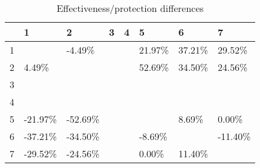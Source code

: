 \begin{table}[ht]
\centering
\begin{tabular}{rlllllll}
  \hline
 & 1 & 2 & 3 & 4 & 5 & 6 & 7 \\ 
  \hline
1 &  & -4.49\% &  &  & 21.97\% & 37.21\% & 29.52\% \\ 
  2 & 4.49\% &  &  &  & 52.69\% & 34.50\% & 24.56\% \\ 
  3 &  &  &  &  &  &  &  \\ 
  4 &  &  &  &  &  &  &  \\ 
  5 & -21.97\% & -52.69\% &  &  &  & 8.69\% & 0.00\% \\ 
  6 & -37.21\% & -34.50\% &  &  & -8.69\% &  & -11.40\% \\ 
  7 & -29.52\% & -24.56\% &  &  & 0.00\% & 11.40\% &  \\ 
   \hline
\end{tabular}
\caption{Effectiveness/protection differences} 
\end{table}
